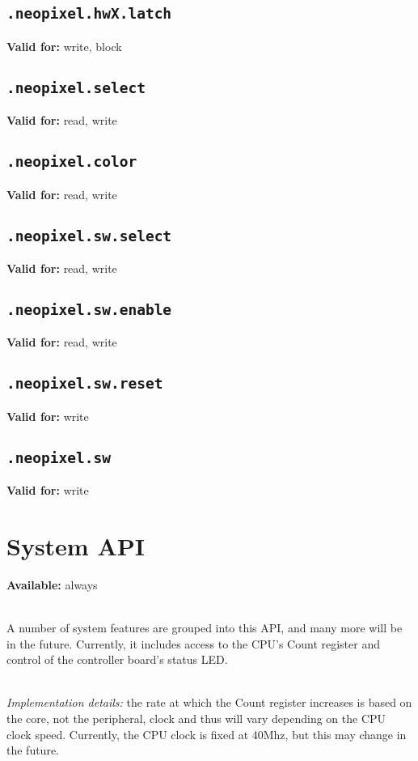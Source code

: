 \documentclass{article}
\begin{document}
\subsection{\texttt{.neopixel.hwX.latch}}
\textbf{Valid for:} write, block

\subsection{\texttt{.neopixel.select}}
\textbf{Valid for:} read, write

\subsection{\texttt{.neopixel.color}}
\textbf{Valid for:} read, write

\subsection{\texttt{.neopixel.sw.select}}
\textbf{Valid for:} read, write

\subsection{\texttt{.neopixel.sw.enable}}
\textbf{Valid for:} read, write

\subsection{\texttt{.neopixel.sw.reset}}
\textbf{Valid for:} write

\subsection{\texttt{.neopixel.sw}}
\textbf{Valid for:} write

\section{System API}
\textbf{Available:} always

~\\
A number of system features are grouped into this API, and many more will be in the future. Currently, it includes access to the CPU's Count register and control of the controller board's status LED.

~\\
\textit{Implementation details:} the rate at which the Count register increases is based on the core, not the peripheral, clock and thus will vary depending on the CPU clock speed.
Currently, the CPU clock is fixed at 40Mhz, but this may change in the future.
\end{document}
